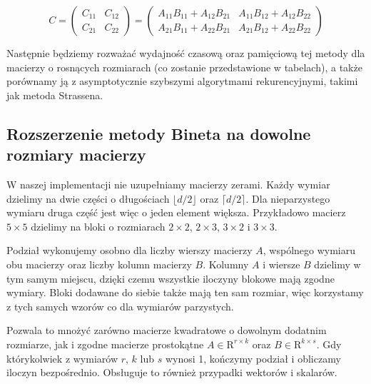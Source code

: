 \documentclass{article}
\begin{document}
\[
\renewcommand{\arraystretch}{1.5}
C = \begin{pmatrix} 
C_{11} & C_{12} \\ 
C_{21} & C_{22} 
\end{pmatrix} = \begin{pmatrix} 
A_{11}B_{11} + A_{12}B_{21} & A_{11}B_{12} + A_{12}B_{22} \\ 
A_{21}B_{11} + A_{22}B_{21} & A_{21}B_{12} + A_{22}B_{22} 
\end{pmatrix}
\]

Następnie będziemy rozważać wydajność czasową oraz pamięciową tej metody dla macierzy o rosnących rozmiarach (co zostanie przedstawione w tabelach), a także porównamy ją z asymptotycznie szybszymi algorytmami rekurencyjnymi, takimi jak metoda Strassena.

\subsection{Rozszerzenie metody Bineta na dowolne rozmiary macierzy}

W naszej implementacji nie uzupełniamy macierzy zerami. Każdy wymiar dzielimy na dwie części o długościach $\lfloor d/2 \rfloor$ oraz $\lceil d/2 \rceil$. Dla nieparzystego wymiaru druga część jest więc o jeden element większa. Przykładowo macierz $5\times5$ dzielimy na bloki o rozmiarach $2\times2$, $2\times3$, $3\times2$ i $3\times3$.

Podział wykonujemy osobno dla liczby wierszy macierzy $A$, wspólnego wymiaru obu macierzy oraz liczby kolumn macierzy $B$. Kolumny $A$ i wiersze $B$ dzielimy w tym samym miejscu, dzięki czemu wszystkie iloczyny blokowe mają zgodne wymiary. Bloki dodawane do siebie także mają ten sam rozmiar, więc korzystamy z tych samych wzorów co dla wymiarów parzystych.

Pozwala to mnożyć zarówno macierze kwadratowe o dowolnym dodatnim rozmiarze, jak i zgodne macierze prostokątne $A\in\mathrm{R}^{r\times k}$ oraz $B\in\mathrm{R}^{k\times s}$. Gdy którykolwiek z wymiarów $r$, $k$ lub $s$ wynosi 1, kończymy podział i obliczamy iloczyn bezpośrednio. Obsługuje to również przypadki wektorów i skalarów.
\end{document}
